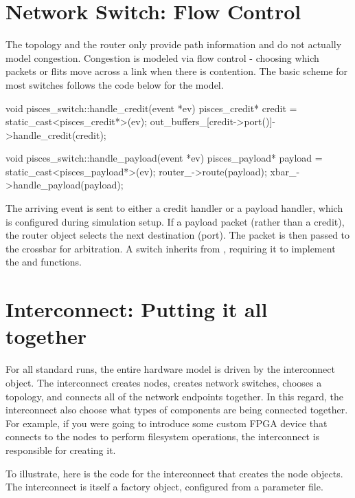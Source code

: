 \section{Network Switch: Flow Control}\label{sec:networkSwitch}
The topology and the router only provide path information and do not actually model congestion.
Congestion is modeled via flow control - choosing which packets or flits move across a link when there is contention.
The basic scheme for most switches follows the code below for the  model.

\begin{CppCode}
void pisces_switch::handle_credit(event *ev)
{
  pisces_credit* credit = static_cast<pisces_credit*>(ev);
  out_buffers_[credit->port()]->handle_credit(credit);
}

void pisces_switch::handle_payload(event *ev)
{
  pisces_payload* payload = static_cast<pisces_payload*>(ev);
  router_->route(payload);
  xbar_->handle_payload(payload);
}
\end{CppCode}
The arriving event is sent to either a credit handler or a payload handler,
which is configured during simulation setup.
If a payload packet (rather than a credit), the router object selects the next destination (port).
The packet is then passed to the crossbar for arbitration.
A switch inherits from , requiring it to implement the  and  functions.

\section{Interconnect: Putting it all together}\label{sec:topInterconnect}
For all standard runs, the entire hardware model is driven by the interconnect object.
The interconnect creates nodes, creates network switches, chooses a topology, and connects all of the network endpoints together.
In this regard, the interconnect also choose what types of components are being connected together.
For example, if you were going to introduce some custom FPGA device that connects to the nodes to perform filesystem operations,
the interconnect is responsible for creating it.

To illustrate, here is the code for the interconnect that creates the node objects. 
The interconnect is itself a factory object, configured from a parameter file.

